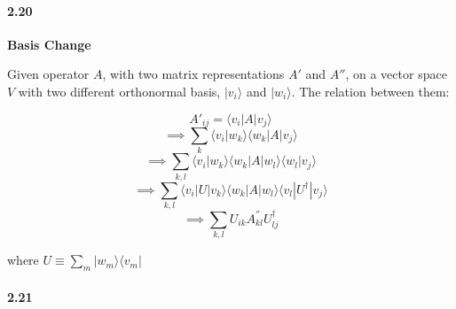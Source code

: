 \paragraph{2.20} \textbf{Basis Change} %

Given operator $A$, with two matrix representations $A'$ and $A''$, on a vector space $V$ with two different orthonormal basis, $|v_i\rangle$ and $|w_i\rangle$.
The relation between them:

$$ A'_{ij} = \langle v_i |A | v_j \rangle $$
$$  \implies \sum_k \langle v_i | w_k \rangle \langle w_k |A | v_j \rangle $$
$$  \implies \sum_{k,l} \langle v_i | w_k \rangle \langle w_k |A | w_l \rangle \langle w_l | v_j \rangle $$
$$  \implies \sum_{k,l} \langle v_i |U| v_k \rangle \langle w_k |A | w_l \rangle \langle v_l |U^{\dagger}| v_j \rangle $$
$$  \implies \sum_{k,l} U_{ik} A_{kl}^{''} U_{lj}^{\dagger} $$

where $U \equiv \sum_m |w_m\rangle \langle v_m|$

\paragraph{2.21} %

